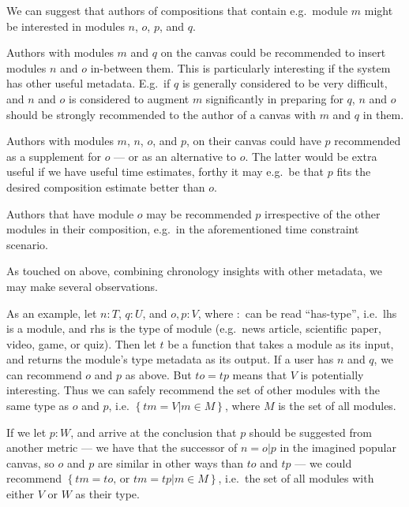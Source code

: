 \begin{itemize*}
  \item We can suggest that authors of compositions that contain e.g.\ module 
$m$ might be interested in modules $n$, $o$, $p$, and $q$.
   \item Authors with modules $m$ and $q$ on the canvas could be recommended 
   to insert modules $n$ and $o$ in-between them. This is particularly 
   interesting if the system has other useful metadata. E.g.\ if $q$ is 
   generally considered to be very difficult, and $n$ and $o$ is considered to 
   augment $m$ significantly in preparing for $q$, $n$ and $o$ should be 
   strongly recommended to the author of a canvas with $m$ and $q$ in them.
   \item Authors with modules $m$, $n$, $o$, and $p$, on their canvas could 
   have $p$ recommended as a supplement for $o$ --- or as an alternative to 
   $o$. The latter would be extra useful if we have useful time estimates, 
   forthy it may e.g.\ be that $p$ fits the desired composition estimate 
   better than $o$.
   \item Authors that have module $o$ may be recommended $p$ irrespective of 
   the other modules in their composition, e.g.\ in the aforementioned time 
   constraint  scenario.
\end{itemize*}

As touched on above, combining chronology insights with other metadata, we may 
make several observations.

As an example, let $n : T$, $q : U$, and $o, p : V$, where $:$ can be read 
``has-type'', i.e.\ lhs is a module, and rhs is the type of module (e.g.\ news 
article, scientific paper, video, game, or quiz). Then let $t$ be a function 
that takes a module as its input, and returns the module's type metadata as 
its output. If a user has $n$ and $q$, we can recommend $o$ and $p$ as above. 
But $t o = t p$ means that $V$ is potentially interesting. Thus we can safely 
recommend the set of other modules with the same type as $o$ and $p$, i.e. 
$\left\{ {t m = V \vert m \in M} \right\}$, where $M$ is the set of all 
modules.

If we let $p : W$, and arrive at the conclusion that $p$ should be suggested 
from another metric --- we have that the successor of $n = o \vert p$ in the 
imagined popular canvas, so $o$ and $p$ are similar in other ways than $t o$ 
and $t p$ --- we could recommend $\left\{ t m = t o\text{, or }t m = t p \vert 
m \in M \right\}$, i.e.\ the set of all modules with either $V$ or $W$ as 
their type.


